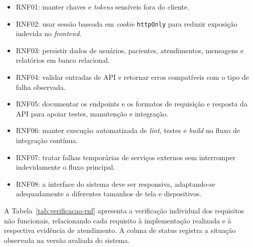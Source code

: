 \begin{itemize}
\item RNF01: manter chaves e \textit{tokens} sensíveis fora do cliente.
\item RNF02: usar sessão baseada em \textit{cookie} \texttt{httpOnly} para reduzir exposição indevida no \textit{frontend}.
\item RNF03: persistir dados de usuários, pacientes, atendimentos, mensagens e relatórios em banco relacional.
\item RNF04: validar entradas de API e retornar erros compatíveis com o tipo de falha observada.
\item RNF05: documentar os endpoints e os formatos de requisição e resposta da API para apoiar testes, manutenção e integração.
\item RNF06: manter execução automatizada de \textit{lint}, testes e \textit{build} no fluxo de integração contínua.
\item RNF07: tratar falhas temporárias de serviços externos sem interromper indevidamente o fluxo principal.
\item RNF08: a interface do sistema deve ser responsiva, adaptando-se adequadamente a diferentes tamanhos de tela e dispositivos.
\end{itemize}

A Tabela~\ref{tab:verificacao-rnf} apresenta a verificação individual dos
requisitos não funcionais, relacionando cada requisito à implementação realizada
e à respectiva evidência de atendimento. A coluna de status registra a situação
observada na versão avaliada do sistema.

